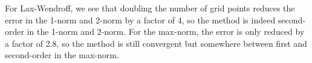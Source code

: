 \documentclass[12pt]{article}
\begin{document}
\begin{enumerate}[(a)]

For Lax-Wendroff, we see that doubling the number of grid points reduces the error in the 1-norm and 2-norm by a factor of 4, so the method is indeed second-order in the 1-norm and 2-norm.  For the max-norm, the error is only reduced by a factor of 2.8, so the method is still convergent but somewhere between first and second-order in the max-norm.


\end{enumerate}
\end{document}
